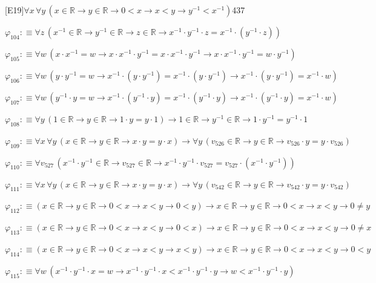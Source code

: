 \begin{fullproof}{[E19]}{$\forall x\,\forall y\,(x \in \mathbb{R} \to y \in \mathbb{R} \to 0 < x \to x < y \to y^{-1} < x^{-1})$}{437}
\begin{abbrevlist}
\item $\varphi_{104} :\equiv \forall z\,(x^{-1} \in \mathbb{R} \to y^{-1} \in \mathbb{R} \to z \in \mathbb{R} \to x^{-1} \cdot y^{-1} \cdot z = x^{-1} \cdot (y^{-1} \cdot z))$
\item $\varphi_{105} :\equiv \forall w\,(x \cdot x^{-1} = w \to x \cdot x^{-1} \cdot y^{-1} = x \cdot x^{-1} \cdot y^{-1} \to x \cdot x^{-1} \cdot y^{-1} = w \cdot y^{-1})$
\item $\varphi_{106} :\equiv \forall w\,(y \cdot y^{-1} = w \to x^{-1} \cdot (y \cdot y^{-1}) = x^{-1} \cdot (y \cdot y^{-1}) \to x^{-1} \cdot (y \cdot y^{-1}) = x^{-1} \cdot w)$
\item $\varphi_{107} :\equiv \forall w\,(y^{-1} \cdot y = w \to x^{-1} \cdot (y^{-1} \cdot y) = x^{-1} \cdot (y^{-1} \cdot y) \to x^{-1} \cdot (y^{-1} \cdot y) = x^{-1} \cdot w)$
\item $\varphi_{108} :\equiv \forall y\,(1 \in \mathbb{R} \to y \in \mathbb{R} \to 1 \cdot y = y \cdot 1) \to 1 \in \mathbb{R} \to y^{-1} \in \mathbb{R} \to 1 \cdot y^{-1} = y^{-1} \cdot 1$
\item $\varphi_{109} :\equiv \forall x\,\forall y\,(x \in \mathbb{R} \to y \in \mathbb{R} \to x \cdot y = y \cdot x) \to \forall y\,(v_{526} \in \mathbb{R} \to y \in \mathbb{R} \to v_{526} \cdot y = y \cdot v_{526})$
\item $\varphi_{110} :\equiv \forall v_{527}\,(x^{-1} \cdot y^{-1} \in \mathbb{R} \to v_{527} \in \mathbb{R} \to x^{-1} \cdot y^{-1} \cdot v_{527} = v_{527} \cdot (x^{-1} \cdot y^{-1}))$
\item $\varphi_{111} :\equiv \forall x\,\forall y\,(x \in \mathbb{R} \to y \in \mathbb{R} \to x \cdot y = y \cdot x) \to \forall y\,(v_{542} \in \mathbb{R} \to y \in \mathbb{R} \to v_{542} \cdot y = y \cdot v_{542})$
\item $\varphi_{112} :\equiv (x \in \mathbb{R} \to y \in \mathbb{R} \to 0 < x \to x < y \to 0 < y) \to x \in \mathbb{R} \to y \in \mathbb{R} \to 0 < x \to x < y \to 0 \neq y$
\item $\varphi_{113} :\equiv (x \in \mathbb{R} \to y \in \mathbb{R} \to 0 < x \to x < y \to 0 < x) \to x \in \mathbb{R} \to y \in \mathbb{R} \to 0 < x \to x < y \to 0 \neq x$
\item $\varphi_{114} :\equiv (x \in \mathbb{R} \to y \in \mathbb{R} \to 0 < x \to x < y \to x < y) \to x \in \mathbb{R} \to y \in \mathbb{R} \to 0 < x \to x < y \to 0 < y$
\item $\varphi_{115} :\equiv \forall w\,(x^{-1} \cdot y^{-1} \cdot x = w \to x^{-1} \cdot y^{-1} \cdot x < x^{-1} \cdot y^{-1} \cdot y \to w < x^{-1} \cdot y^{-1} \cdot y)$

\end{abbrevlist}
\end{fullproof}
